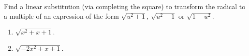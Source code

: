 Find a linear substitution (via completing the square) to transform the radical to a multiple of an expression of the form $\sqrt{u^2+1}$, $\sqrt{u^2-1}$ or $\sqrt{1-u^2}$.

\begin{enumerate}[ref={\fcProblemRef}]
\item \label{problemcompletesquaresqrt(x^2+x+1)} $\sqrt{x^2+x+1}$.
\item \label{problemcompletesquaresqrt(-2x^2+x+1)} $\sqrt{-2x^2+x+1}$.
\end{enumerate}
